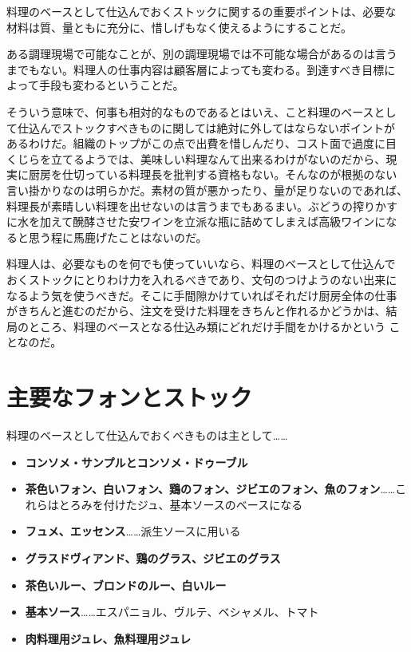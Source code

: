 料理のベースとして仕込んでおくストックに関するの重要ポイントは、必要な
材料は質、量ともに充分に、惜しげもなく使えるようにすることだ。

ある調理現場で可能なことが、別の調理現場では不可能な場合があるのは言う
までもない。料理人の仕事内容は顧客層によっても変わる。到達すべき目標に
よって手段も変わるということだ。

そういう意味で、何事も相対的なものであるとはいえ、こと料理のベースとし
て仕込んでストックすべきものに関しては絶対に外してはならないポイントが
あるわけだ。組織のトップがこの点で出費を惜しんだり、コスト面で過度に目
くじらを立てるようでは、美味しい料理なんて出来るわけがないのだから、現
実に厨房を仕切っている料理長を批判する資格もない。そんなのが根拠のない
言い掛かりなのは明らかだ。素材の質が悪かったり、量が足りないのであれば、
料理長が素晴しい料理を出せないのは言うまでもあるまい。ぶどうの搾りかす
に水を加えて醗酵させた安ワインを立派な瓶に詰めてしまえば高級ワインにな
ると思う程に馬鹿げたことはないのだ。

料理人は、必要なものを何でも使っていいなら、料理のベースとして仕込んで
おくストックにとりわけ力を入れるべきであり、文句のつけようのない出来に
なるよう気を使うべきだ。そこに手間隙かけていればそれだけ厨房全体の仕事
がきちんと進むのだから、注文を受けた料理をきちんと作れるかどうかは、結
局のところ、料理のベースとなる仕込み類にどれだけ手間をかけるかという
ことなのだ。

\newpage

\hypertarget{principaux-fonds-de-cuisine}{%
\section{主要なフォンとストック}\label{principaux-fonds-de-cuisine}}


料理のベースとして仕込んでおくべきものは主として\ldots{}\ldots{}

\begin{itemize}
\tightlist
\item
  \textbf{コンソメ・サンプルとコンソメ・ドゥーブル}
\item
  \textbf{茶色いフォン、白いフォン、鶏のフォン、ジビエのフォン、魚のフォン}\ldots{}\ldots{}これらはとろみを付けたジュ、基本ソースのベースになる
\item
  \textbf{フュメ、エッセンス}\ldots{}\ldots{}派生ソースに用いる
\item
  \textbf{グラスドヴィアンド、鶏のグラス、ジビエのグラス}
\item
  \textbf{茶色いルー、ブロンドのルー、白いルー}
\item
  \textbf{基本ソース}\ldots{}\ldots{}エスパニョル、ヴルテ、ベシャメル、トマト
\item
  \textbf{肉料理用ジュレ、魚料理用ジュレ}
\end{itemize}

